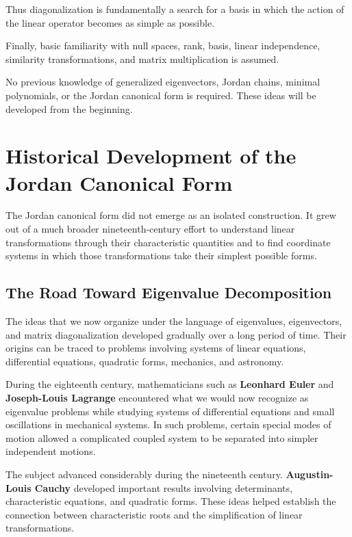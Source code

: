 \documentclass[11pt]{article}
\begin{document}
Thus diagonalization is fundamentally a search for a basis in which
the action of the linear operator becomes as simple as possible.

Finally, basic familiarity with null spaces, rank, basis, linear
independence, similarity transformations, and matrix multiplication is
assumed.

No previous knowledge of generalized eigenvectors, Jordan chains,
minimal polynomials, or the Jordan canonical form is required.  These
ideas will be developed from the beginning.


\section{Historical Development of the Jordan Canonical Form}

The Jordan canonical form did not emerge as an isolated construction.
It grew out of a much broader nineteenth-century effort to understand
linear transformations through their characteristic quantities and to
find coordinate systems in which those transformations take their
simplest possible forms.

\subsection{The Road Toward Eigenvalue Decomposition}

The ideas that we now organize under the language of eigenvalues,
eigenvectors, and matrix diagonalization developed gradually over a
long period of time.  Their origins can be traced to problems involving
systems of linear equations, differential equations, quadratic forms,
mechanics, and astronomy.

During the eighteenth century, mathematicians such as
\textbf{Leonhard Euler} and \textbf{Joseph-Louis Lagrange} encountered
what we would now recognize as eigenvalue problems while studying
systems of differential equations and small oscillations in mechanical
systems.  In such problems, certain special modes of motion allowed a
complicated coupled system to be separated into simpler independent
motions.

The subject advanced considerably during the nineteenth century.
\textbf{Augustin-Louis Cauchy} developed important results involving
determinants, characteristic equations, and quadratic forms.  These
ideas helped establish the connection between characteristic roots and
the simplification of linear transformations.
\end{document}
